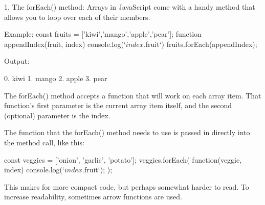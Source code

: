 1. The forEach() method:
Arrays in JavaScript come with a handy method that allows you to loop over each of their members. 

Example:
const fruits = ['kiwi','mango','apple','pear'];
function appendIndex(fruit, index) {
    console.log(`${index}. ${fruit}`)
}
fruits.forEach(appendIndex);

Output: 

0. kiwi
1. mango
2. apple
3. pear

The forEach() method accepts a function that will work on each array item. 
That function's first parameter is the current array item itself, 
and the second (optional) parameter is the index.

The function that the forEach() method needs to use is 
passed in directly into the method call, like this:


const veggies = ['onion', 'garlic', 'potato'];
veggies.forEach( function(veggie, index) {
    console.log(`${index}. ${fruit}`);
});

This makes for more compact code, but perhaps somewhat harder to read. 
To increase readability, sometimes arrow functions are used.